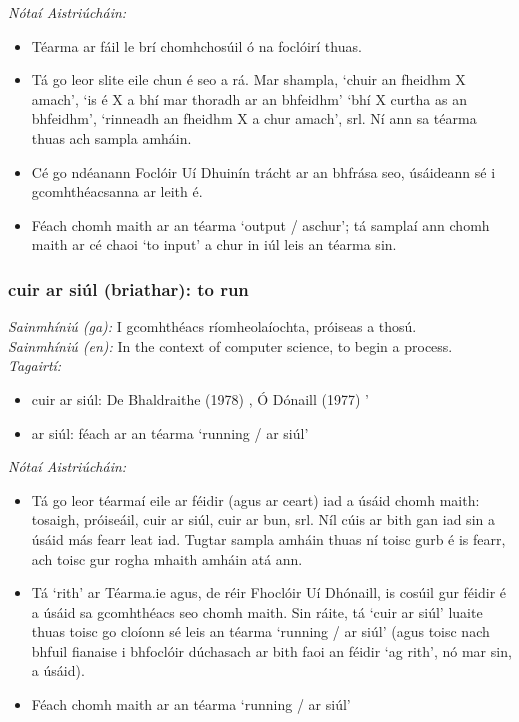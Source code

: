  \noindent \textit{Nótaí Aistriúcháin:}
\begin{itemize}
	\item Téarma ar fáil le brí chomhchosúil ó na foclóirí thuas.
	\item Tá go leor slite eile chun é seo a rá. Mar shampla, `chuir an fheidhm X amach', `is é X a bhí mar thoradh ar an bhfeidhm' `bhí X curtha as an bhfeidhm', `rinneadh an fheidhm X a chur amach', srl. Ní ann sa téarma thuas ach sampla amháin.
	\item Cé go ndéanann Foclóir Uí Dhuinín trácht ar an bhfrása seo, úsáideann sé i gcomhthéacsanna ar leith é.
	\item Féach chomh maith ar an téarma `output / aschur'; tá samplaí ann chomh maith ar cé chaoi `to input' a chur in iúl leis an téarma sin.
\end{itemize}


\subsubsection*{cuir ar siúl (briathar): to run}
 \noindent \textit{Sainmhíniú (ga):} I gcomhthéacs ríomheolaíochta, próiseas a thosú.
\\
 \noindent \textit{Sainmhíniú (en):} In the context of computer science, to begin a process.
\\
 \noindent \textit{Tagairtí:}
\begin{itemize}
	\item cuir ar siúl: De Bhaldraithe (1978) \cite{de-bhaldraithe}, Ó Dónaill (1977) \cite{odonaill}'
	\item ar siúl: féach ar an téarma `running / ar siúl'
\end{itemize}

 \noindent \textit{Nótaí Aistriúcháin:}
\begin{itemize}
	\item Tá go leor téarmaí eile ar féidir (agus ar ceart) iad a úsáid chomh maith: tosaigh, próiseáil, cuir ar siúl, cuir ar bun, srl. Níl cúis ar bith gan iad sin a úsáid más fearr leat iad. Tugtar sampla amháin thuas ní toisc gurb é is fearr, ach toisc gur rogha mhaith amháin atá ann.
	\item Tá `rith' ar Téarma.ie agus, de réir Fhoclóir Uí Dhónaill, is cosúil gur féidir é a úsáid sa gcomhthéacs seo chomh maith. Sin ráite, tá `cuir ar siúl' luaite thuas toisc go cloíonn sé leis an téarma `running / ar siúl' (agus toisc nach bhfuil fianaise i bhfoclóir dúchasach ar bith faoi an féidir `ag rith', nó mar sin, a úsáid).
	\item Féach chomh maith ar an téarma `running / ar siúl'
\end{itemize}



